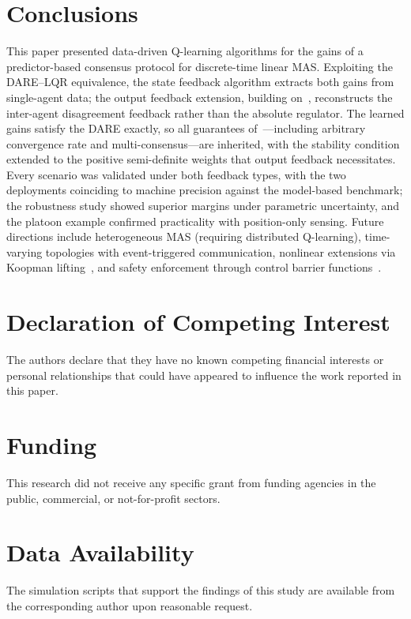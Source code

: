 \documentclass[final,5p,times]{elsarticle}
\theoremstyle{plain}
\theoremstyle{definition}
\theoremstyle{remark}
\begin{document}
\section{Conclusions}
\label{sec:conc}
This paper presented data-driven Q-learning algorithms for the gains of a predictor-based consensus protocol for discrete-time linear MAS. Exploiting the DARE--LQR equivalence, the state feedback algorithm extracts both gains from single-agent data; the output feedback extension, building on~\cite{rizvi2022}, reconstructs the inter-agent disagreement feedback rather than the absolute regulator. The learned gains satisfy the DARE exactly, so all guarantees of~\cite{cacace2024}---including arbitrary convergence rate and multi-consensus---are inherited, with the stability condition extended to the positive semi-definite weights that output feedback necessitates. Every scenario was validated under both feedback types, with the two deployments coinciding to machine precision against the model-based benchmark; the robustness study showed superior margins under parametric uncertainty, and the platoon example confirmed practicality with position-only sensing.
Future directions include heterogeneous MAS (requiring distributed Q-learning), time-varying topologies with event-triggered communication, nonlinear extensions via Koopman lifting~\cite{dony2024koopman}, and safety enforcement through control barrier functions~\cite{dony2025debf}.
\section*{Declaration of Competing Interest}
The authors declare that they have no known competing financial interests or personal relationships that could have appeared to influence the work reported in this paper.
\section*{Funding}
This research did not receive any specific grant from funding agencies in the public, commercial, or not-for-profit sectors.
\section*{Data Availability}
The simulation scripts that support the findings of this study are available from the corresponding author upon reasonable request.
\end{document}
